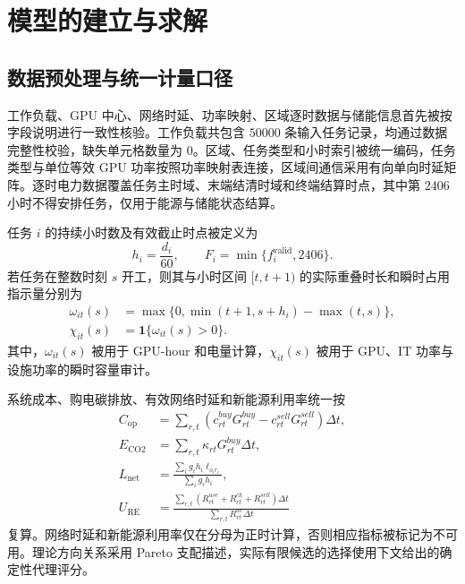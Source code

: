 \section{模型的建立与求解}

\subsection{数据预处理与统一计量口径}

工作负载、GPU 中心、网络时延、功率映射、区域逐时数据与储能信息首先被按字段说明进行一致性核验。工作负载共包含 $50000$ 条输入任务记录，均通过数据完整性校验，缺失单元格数量为 $0$。区域、任务类型和小时索引被统一编码，任务类型与单位等效 GPU 功率按照功率映射表连接，区域间通信采用有向单向时延矩阵。逐时电力数据覆盖任务主时域、末端结清时域和终端结算时点，其中第 $2406$ 小时不得安排任务，仅用于能源与储能状态结算。

任务 $i$ 的持续小时数及有效截止时点被定义为
\begin{equation}
h_i=\frac{d_i}{60},\qquad F_i=\min\{f_i^{\mathrm{valid}},2406\}.
\label{eq:duration_deadline}
\end{equation}
若任务在整数时刻 $s$ 开工，则其与小时区间 $[t,t+1)$ 的实际重叠时长和瞬时占用指示量分别为
\begin{align}
\omega_{it}(s)&=\max\{0,\min(t+1,s+h_i)-\max(t,s)\},\\
\chi_{it}(s)&=\mathbf 1\{\omega_{it}(s)>0\}.
\end{align}
其中，$\omega_{it}(s)$ 被用于 GPU-hour 和电量计算，$\chi_{it}(s)$ 被用于 GPU、IT 功率与设施功率的瞬时容量审计。

系统成本、购电碳排放、有效网络时延和新能源利用率统一按
\begin{align}
C_{\mathrm{op}}
&=\sum_{r,t}\left(c_{rt}^{buy}G_{rt}^{buy}
-c_{rt}^{sell}G_{rt}^{sell}\right)\Delta t,\\
E_{\mathrm{CO2}}
&=\sum_{r,t}\kappa_{rt}G_{rt}^{buy}\Delta t,\\
L_{\mathrm{net}}
&=\frac{\sum_i g_ih_i\ell_{o_ir_i}}{\sum_i g_ih_i},\\
U_{\mathrm{RE}}
&=\frac{\sum_{r,t}(R_{rt}^{use}+R_{rt}^{ch}+R_{rt}^{sell})\Delta t}
{\sum_{r,t}R_{rt}^{av}\Delta t}
\end{align}
复算。网络时延和新能源利用率仅在分母为正时计算，否则相应指标被标记为不可用。理论方向关系采用 Pareto 支配描述，实际有限候选的选择使用下文给出的确定性代理评分\cite{huber1964robust,miettinen1999nonlinear}。

